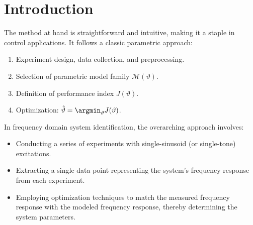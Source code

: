 \section{Introduction}

The method at hand is straightforward and intuitive, making it a staple in control applications. 
It follows a classic parametric approach:
\begin{enumerate}
    \item Experiment design, data collection, and preprocessing.
    \item Selection of parametric model family $\mathcal{M}(\vartheta)$. 
    \item Definition of performance index $J(\vartheta)$. 
    \item Optimization: $\hat{\vartheta}=\argmin_{\vartheta}{J(\vartheta)}$.  
\end{enumerate}
In frequency domain system identification, the overarching approach involves:
\begin{itemize}
    \item Conducting a series of experiments with single-sinusoid (or single-tone) excitations.
    \item Extracting a single data point representing the system's frequency response from each experiment.
    \item Employing optimization techniques to match the measured frequency response with the modeled frequency response, thereby determining the system parameters.
\end{itemize}